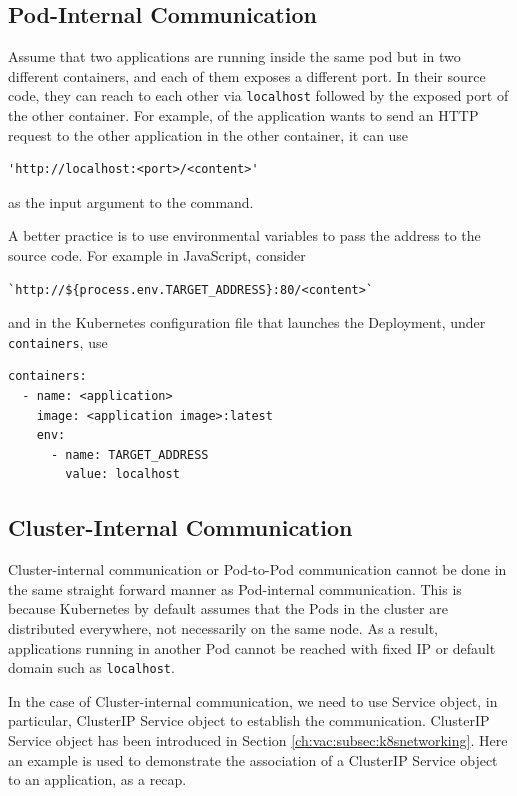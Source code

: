 \subsection{Pod-Internal Communication}

Assume that two applications are running inside the same pod but in two different containers, and each of them exposes a different port. In their source code, they can reach to each other via \verb|localhost| followed by the exposed port of the other container. For example, of the application wants to send an HTTP request to the other application in the other container, it can use
\begin{lstlisting}
'http://localhost:<port>/<content>'
\end{lstlisting}
as the input argument to the command.

A better practice is to use environmental variables to pass the address to the source code. For example in JavaScript, consider
\begin{lstlisting}
`http://${process.env.TARGET_ADDRESS}:80/<content>`
\end{lstlisting}
and in the Kubernetes configuration file that launches the Deployment, under \verb|containers|, use
\begin{lstlisting}
containers:
  - name: <application>
    image: <application image>:latest
    env:
      - name: TARGET_ADDRESS
        value: localhost
\end{lstlisting}

\subsection{Cluster-Internal Communication}

Cluster-internal communication or Pod-to-Pod communication cannot be done in the same straight forward manner as Pod-internal communication. This is because Kubernetes by default assumes that the Pods in the cluster are distributed everywhere, not necessarily on the same node. As a result, applications running in another Pod cannot be reached with fixed IP or default domain such as \verb|localhost|.

In the case of Cluster-internal communication, we need to use Service object, in particular, ClusterIP Service object to establish the communication. ClusterIP Service object has been introduced in Section \ref{ch:vac:subsec:k8snetworking}. Here an example is used to demonstrate the association of a ClusterIP Service object to an application, as a recap.

